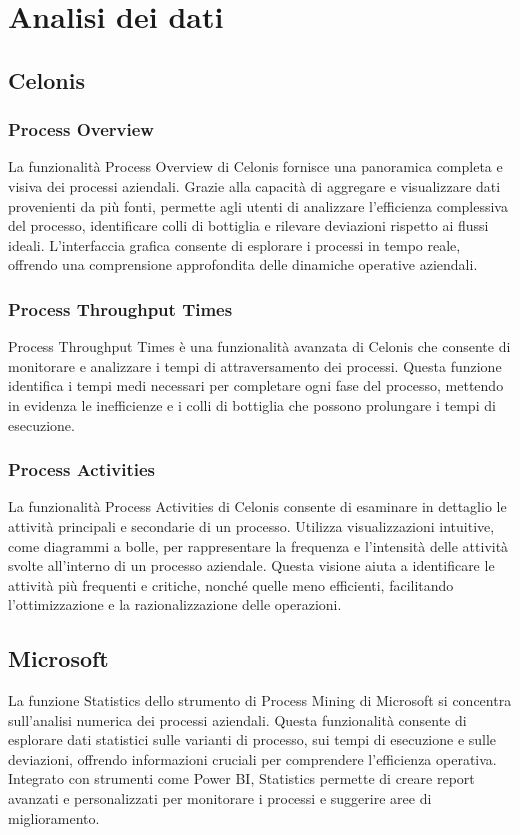 \documentclass{article}
\begin{document}
\section{Analisi dei dati}

\subsection{Celonis}

\subsubsection{Process Overview}
La funzionalità Process Overview di Celonis fornisce una panoramica completa e visiva dei processi aziendali. Grazie alla capacità di aggregare e visualizzare dati provenienti da più fonti, permette agli utenti di analizzare l’efficienza complessiva del processo, identificare colli di bottiglia e rilevare deviazioni rispetto ai flussi ideali. L'interfaccia grafica consente di esplorare i processi in tempo reale, offrendo una comprensione approfondita delle dinamiche operative aziendali.

\subsubsection{Process Throughput Times}
Process Throughput Times è una funzionalità avanzata di Celonis che consente di monitorare e analizzare i tempi di attraversamento dei processi. Questa funzione identifica i tempi medi necessari per completare ogni fase del processo, mettendo in evidenza le inefficienze e i colli di bottiglia che possono prolungare i tempi di esecuzione.

\subsubsection{Process Activities}
La funzionalità Process Activities di Celonis consente di esaminare in dettaglio le attività principali e secondarie di un processo. Utilizza visualizzazioni intuitive, come diagrammi a bolle, per rappresentare la frequenza e l'intensità delle attività svolte all'interno di un processo aziendale. Questa visione aiuta a identificare le attività più frequenti e critiche, nonché quelle meno efficienti, facilitando l'ottimizzazione e la razionalizzazione delle operazioni.

\subsection{Microsoft}
La funzione Statistics dello strumento di Process Mining di Microsoft si concentra sull’analisi numerica dei processi aziendali. Questa funzionalità consente di esplorare dati statistici sulle varianti di processo, sui tempi di esecuzione e sulle deviazioni, offrendo informazioni cruciali per comprendere l’efficienza operativa. Integrato con strumenti come Power BI, Statistics permette di creare report avanzati e personalizzati per monitorare i processi e suggerire aree di miglioramento.
\end{document}
